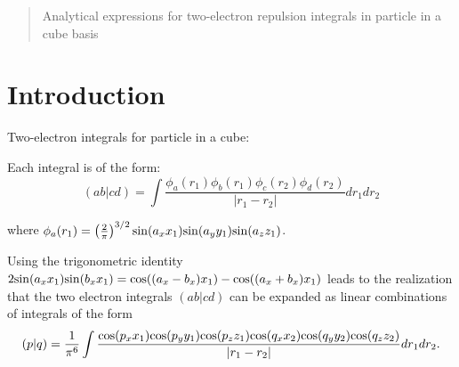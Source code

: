 \documentclass[12pt]{article}
\begin{document}
\maketitle

\begin{abstract}
Analytical expressions for two-electron repulsion integrals in particle
in a cube basis
\end{abstract}

\section{Introduction}
Two-electron integrals for particle in a cube:

Each integral is of the form:
\begin{equation}
(ab|cd) = \int \frac{ \phi_a(r_1) \phi_b(r_1) \phi_c(r_2) \phi_d(r_2)}{|r_1 - r_2|} dr_1 dr_2
\end{equation}

where $\phi_a(r_1) =\left(\frac{2}{\pi}\right)^{3/2} {\rm sin}(a_x x_1) {\rm sin}(a_y y_1) {\rm sin}(a_z z_1)$.

Using the trigonometric identity $2 {\rm sin}(a_x x_1) {\rm sin}(b_x x_1) = {\rm cos}((a_x - b_x) x_1) - {\rm cos}((a_x + b_x) x_1)$ leads to the realization that the two electron integrals $(ab|cd)$ can be expanded as linear combinations of integrals of the form 
\begin{equation}
(p|q) = \frac{1}{\pi^6} \int \frac{{\rm cos}(p_x x_1) {\rm cos}(p_y y_1) {\rm cos}(p_z z_1)  {\rm cos}(q_x x_2) {\rm cos}(q_y y_2) {\rm cos}(q_z z_2) }{|r_1 - r_2|} dr_1 dr_2.
\end{equation}


%
%
\end{document}
